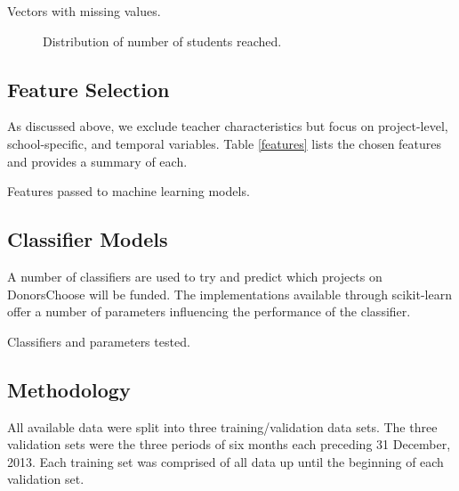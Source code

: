 \documentclass[11pt]{article}
\begin{document}
\begin{minipage}[c]{0.3\pagewidth}
\vspace{0pt}
\begin{table}[H]
\centering \small \renewcommand{\arraystretch}{1.1}

\caption{Vectors with missing values.}\label{missing}
\end{table}
\end{minipage} \hfill \begin{minipage}[c]{0.45\pagewidth}
\vspace{0pt}
\begin{figure}[H]
\centering

\caption{Distribution of number of students reached.} \label{sr_dist}
\end{figure}
\end{minipage}

\subsection{Feature Selection}
As discussed above, we exclude teacher characteristics but focus on project-level, school-specific, and temporal variables. Table \ref{features} lists the chosen features and provides a summary of each. 
\begin{table}[H]
\centering \small \renewcommand{\arraystretch}{1.1}

\caption{Features passed to machine learning models.}\label{features}
\end{table}

\subsection{Classifier Models}
A number of classifiers are used to try and predict which projects on DonorsChoose will be funded. The implementations available through scikit-learn offer a number of parameters influencing the performance of the classifier. 

\begin{table}[H]
\centering \small \renewcommand{\arraystretch}{1.1}

\caption{Classifiers and parameters tested.}\label{classifiers}
\end{table}

\subsection{Methodology}
All available data were split into three training/validation data sets. The three validation sets were the three periods of six months each preceding 31 December, 2013. Each training set was comprised of all data up until the beginning of each validation set.
\end{document}
